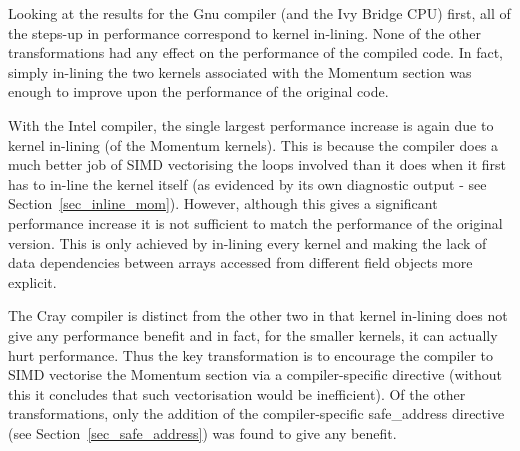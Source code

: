 \documentclass[journal]{IEEEtran}
\begin{document}
Looking at the results for the Gnu compiler (and the Ivy Bridge CPU)
first, all of the steps-up in performance correspond to kernel
in-lining. None of the other transformations had any effect on the
performance of the compiled code. In fact, simply in-lining the two
kernels associated with the Momentum section was enough to improve
upon the performance of the original code. 

With the Intel compiler, the single largest performance increase is
again due to kernel in-lining (of the Momentum kernels). This is
because the compiler does a much better job of SIMD vectorising the
loops involved than it does when it first has to in-line the kernel
itself (as evidenced by its own diagnostic output - see
Section~\ref{sec_inline_mom}). However, although this gives a
significant performance increase it is not sufficient to match the
performance of the original version. This is only achieved by
in-lining every kernel and making the lack of data dependencies
between arrays accessed from different field objects more explicit.

The Cray compiler is distinct from the other two in that kernel
in-lining does not give any performance benefit and in fact, for the
smaller kernels, it can actually hurt performance. Thus the key
transformation is to encourage the compiler to SIMD vectorise the
Momentum section via a compiler-specific directive (without this it
concludes that such vectorisation would be inefficient). Of the other
transformations, only the addition of the compiler-specific
safe\_address directive (see Section~\ref{sec_safe_address}) was found
to give any benefit.
\end{document}
